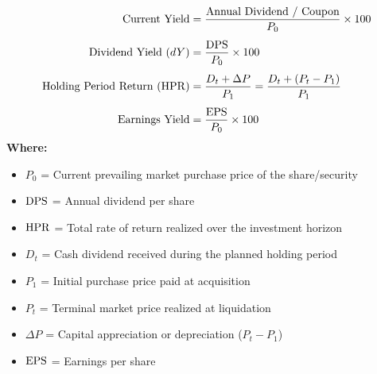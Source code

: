 \begin{formulabox}
\begin{align*}
    \text{Current Yield} &= \frac{\text{Annual Dividend / Coupon}}{P_0} \times 100 \\[4pt]
    \text{Dividend Yield } (dY) &= \frac{\operatorname{DPS}}{P_0} \times 100 \\[4pt]
    \text{Holding Period Return } (\operatorname{HPR}) &= \frac{D_t + \Delta P}{P_1} = \frac{D_t + (P_t - P_1)}{P_1} \\[4pt]
    \text{Earnings Yield} &= \frac{\operatorname{EPS}}{P_0} \times 100
\end{align*}
\textbf{Where:}
\begin{itemize}[noitemsep, topsep=2pt]
    \item $P_0$ = Current prevailing market purchase price of the share/security
    \item $\operatorname{DPS}$ = Annual dividend per share
    \item $\operatorname{HPR}$ = Total rate of return realized over the investment horizon
    \item $D_t$ = Cash dividend received during the planned holding period
    \item $P_1$ = Initial purchase price paid at acquisition
    \item $P_t$ = Terminal market price realized at liquidation
    \item $\Delta P$ = Capital appreciation or depreciation ($P_t - P_1$)
    \item $\operatorname{EPS}$ = Earnings per share
\end{itemize}
\end{formulabox}

